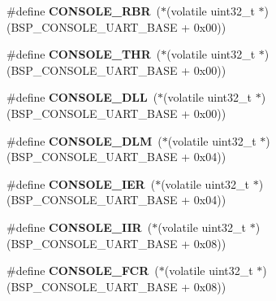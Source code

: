 \begin{DoxyCompactItemize}
\item 
\mbox{\label{uart-output-char_8h_ab59dba3dd1b6a72e0033f4b7af353809}} 
\#define {\bfseries C\+O\+N\+S\+O\+L\+E\+\_\+\+R\+BR}~($\ast$(volatile uint32\+\_\+t $\ast$) (B\+S\+P\+\_\+\+C\+O\+N\+S\+O\+L\+E\+\_\+\+U\+A\+R\+T\+\_\+\+B\+A\+SE + 0x00))
\item 
\mbox{\label{uart-output-char_8h_a03c29be709916b563cff4a5829b29e48}} 
\#define {\bfseries C\+O\+N\+S\+O\+L\+E\+\_\+\+T\+HR}~($\ast$(volatile uint32\+\_\+t $\ast$) (B\+S\+P\+\_\+\+C\+O\+N\+S\+O\+L\+E\+\_\+\+U\+A\+R\+T\+\_\+\+B\+A\+SE + 0x00))
\item 
\mbox{\label{uart-output-char_8h_a7db4ebc687deea9854fed5a71c1e1dea}} 
\#define {\bfseries C\+O\+N\+S\+O\+L\+E\+\_\+\+D\+LL}~($\ast$(volatile uint32\+\_\+t $\ast$) (B\+S\+P\+\_\+\+C\+O\+N\+S\+O\+L\+E\+\_\+\+U\+A\+R\+T\+\_\+\+B\+A\+SE + 0x00))
\item 
\mbox{\label{uart-output-char_8h_ac001ed28d4d599dc67aa726147f030f6}} 
\#define {\bfseries C\+O\+N\+S\+O\+L\+E\+\_\+\+D\+LM}~($\ast$(volatile uint32\+\_\+t $\ast$) (B\+S\+P\+\_\+\+C\+O\+N\+S\+O\+L\+E\+\_\+\+U\+A\+R\+T\+\_\+\+B\+A\+SE + 0x04))
\item 
\mbox{\label{uart-output-char_8h_abc31be56c7c71e3ff0f3351ffcaa8e8d}} 
\#define {\bfseries C\+O\+N\+S\+O\+L\+E\+\_\+\+I\+ER}~($\ast$(volatile uint32\+\_\+t $\ast$) (B\+S\+P\+\_\+\+C\+O\+N\+S\+O\+L\+E\+\_\+\+U\+A\+R\+T\+\_\+\+B\+A\+SE + 0x04))
\item 
\mbox{\label{uart-output-char_8h_afaef90853ead3b642eec94386321626e}} 
\#define {\bfseries C\+O\+N\+S\+O\+L\+E\+\_\+\+I\+IR}~($\ast$(volatile uint32\+\_\+t $\ast$) (B\+S\+P\+\_\+\+C\+O\+N\+S\+O\+L\+E\+\_\+\+U\+A\+R\+T\+\_\+\+B\+A\+SE + 0x08))
\item 
\mbox{\label{uart-output-char_8h_a93e31b81387a4bf3a3c3ab32b87c1e6e}} 
\#define {\bfseries C\+O\+N\+S\+O\+L\+E\+\_\+\+F\+CR}~($\ast$(volatile uint32\+\_\+t $\ast$) (B\+S\+P\+\_\+\+C\+O\+N\+S\+O\+L\+E\+\_\+\+U\+A\+R\+T\+\_\+\+B\+A\+SE + 0x08))
\item 

\end{DoxyCompactItemize}
